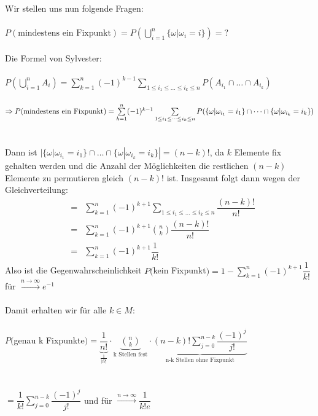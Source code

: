 \documentclass[10pt,a4paper]{report}
\numberwithin{equation}{section}
\numberwithin{figure}{section}
\theoremstyle{plain}
\theoremstyle{definition}
\theoremstyle{plain}
\theoremstyle{definition}
\theoremstyle{remark}
\theoremstyle{plain}
\begin{document}
 Wir stellen uns nun folgende Fragen:\\\\
 $P(\text{mindestens ein Fixpunkt})=P\left(\bigcup\limits_{i=1}^n \{\omega|\omega_i=i\}\right)=$?\\\\
Die Formel von Sylvester:\\\\
$P\left(\bigcup\limits_{i=1}^nA_i\right)=\sum\limits_{k=1}^n(-1)^{k-1}\sum\limits_{1\leq i_1 \leq \dots \leq i_k \leq n}P(A_{i_1}\cap\dots\cap A_{i_k})$\\\\
$\Rightarrow P(\text{mindestens ein Fixpunkt})\\\\
=\sum\limits_{k=1}^n(-1)^{k-1}\sum\limits_{1\leq i_1 \leq \dots \leq i_k \leq n}P(\{\omega|\omega_{i_1}=i_1\}\cap\dots\cap \{\omega|\omega_{i_k}=i_k\})$\\\\\\
Dann ist $|\{\omega|\omega_{i_1}=i_1\}\cap\dots\cap \{\omega|\omega_{i_k}=i_k\}|=(n-k)!$, da $k$ Elemente fix gehalten werden und die Anzahl der Möglichkeiten die restlichen $(n-k)$ Elemente zu permutieren gleich $(n-k)!$ ist. Insgesamt folgt dann wegen der Gleichverteilung:
\begin{eqnarray*}
&=&\sum\limits_{k=1}^n(-1)^{k+1}\sum\limits_{1\leq i_1 \leq \dots \leq i_k \leq n}\dfrac{(n-k)!}{n!}\\
&=&\sum\limits_{k=1}^n(-1)^{k+1}\binom{n}{k}\dfrac{(n-k)!}{n!}\\
&=&\sum\limits_{k=1}^n(-1)^{k+1}\dfrac{1}{k!}
\end{eqnarray*}
Also ist die Gegenwahrscheinlichkeit $P($kein Fixpunkt$)=1-\sum\limits_{k=1}^n(-1)^{k+1}\dfrac{1}{k!}$ für $\overset{n \to \infty}{\rightarrow} e^{-1}$\\\\
Damit erhalten wir für alle $k \in M$:\\\\
$P($genau k Fixpunkte$)=\underbrace{\dfrac{1}{n!}}_\frac{1}{|\Omega|}\cdot \underbrace{\binom{n}{k}}_{\text{k Stellen fest}}\cdot \underbrace{(n-k)!\sum\limits_{j=0}^{n-k}\dfrac{(-1)^j}{j!}}_{\text{n-k Stellen ohne Fixpunkt}}$\\\\\\
$=\dfrac{1}{k!}\sum\limits_{j=0}^{n-k}\dfrac{(-1)^j}{j!}$ und für $\overset{n \to \infty}{\rightarrow} \dfrac{1}{k!e}$ \\\\
\end{document}
